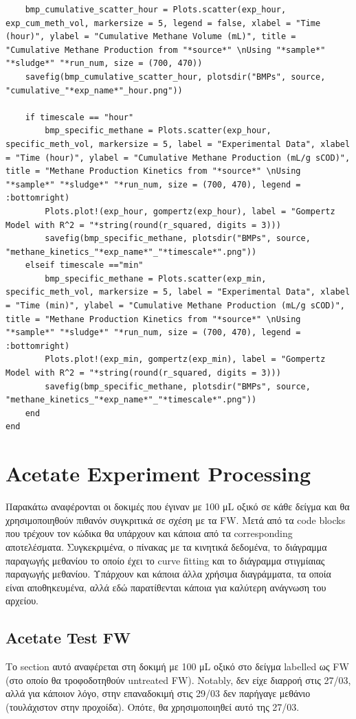 \documentclass[11pt]{article}
\begin{document}
\begin{verbatim}
    bmp_cumulative_scatter_hour = Plots.scatter(exp_hour, exp_cum_meth_vol, markersize = 5, legend = false, xlabel = "Time (hour)", ylabel = "Cumulative Methane Volume (mL)", title = "Cumulative Methane Production from "*source*" \nUsing "*sample*" "*sludge*" "*run_num, size = (700, 470))
    savefig(bmp_cumulative_scatter_hour, plotsdir("BMPs", source, "cumulative_"*exp_name*"_hour.png"))

    if timescale == "hour"
        bmp_specific_methane = Plots.scatter(exp_hour, specific_meth_vol, markersize = 5, label = "Experimental Data", xlabel = "Time (hour)", ylabel = "Cumulative Methane Production (mL/g sCOD)", title = "Methane Production Kinetics from "*source*" \nUsing "*sample*" "*sludge*" "*run_num, size = (700, 470), legend = :bottomright)
        Plots.plot!(exp_hour, gompertz(exp_hour), label = "Gompertz Model with R^2 = "*string(round(r_squared, digits = 3)))
        savefig(bmp_specific_methane, plotsdir("BMPs", source, "methane_kinetics_"*exp_name*"_"*timescale*".png"))
    elseif timescale =="min" 
        bmp_specific_methane = Plots.scatter(exp_min, specific_meth_vol, markersize = 5, label = "Experimental Data", xlabel = "Time (min)", ylabel = "Cumulative Methane Production (mL/g sCOD)", title = "Methane Production Kinetics from "*source*" \nUsing "*sample*" "*sludge*" "*run_num, size = (700, 470), legend = :bottomright)
        Plots.plot!(exp_min, gompertz(exp_min), label = "Gompertz Model with R^2 = "*string(round(r_squared, digits = 3)))
        savefig(bmp_specific_methane, plotsdir("BMPs", source, "methane_kinetics_"*exp_name*"_"*timescale*".png"))
    end
end

\end{verbatim}

\section{Acetate Experiment Processing}
\label{sec:org863f75c}
Παρακάτω αναφέρονται οι δοκιμές που έγιναν με 100 μL οξικό σε κάθε δείγμα και θα χρησιμοποιηθούν πιθανόν συγκριτικά σε σχέση με τα FW. Μετά από τα code blocks που τρέχουν τον κώδικα θα υπάρχουν και κάποια από τα corresponding αποτελέσματα. Συγκεκριμένα, ο πίνακας με τα κινητικά δεδομένα, το διάγραμμα παραγωγής μεθανίου το οποίο έχει το curve fitting και το διάγραμμα στιγμίαιας παραγωγής μεθανίου. Υπάρχουν και κάποια άλλα χρήσιμα διαγράμματα, τα οποία είναι αποθηκευμένα, αλλά εδώ παρατίθενται κάποια για καλύτερη ανάγνωση του αρχείου.

\subsection{Acetate Test FW}
\label{sec:orge60aa3f}
Το section αυτό αναφέρεται στη δοκιμή με 100 μL οξικό στο δείγμα labelled ως FW (στο οποίο θα τροφοδοτηθούν untreated FW). Notably, δεν είχε διαρροή στις 27/03, αλλά για κάποιον λόγο, στην επαναδοκιμή στις 29/03 δεν παρήγαγε μεθάνιο (τουλάχιστον στην προχοίδα). Οπότε, θα χρησιμοποιηθεί αυτό της 27/03.
\end{document}
